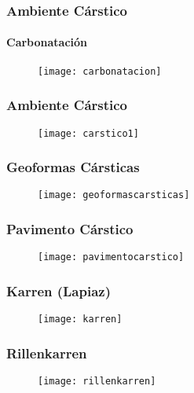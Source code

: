 \documentclass{beamer}
\begin{document}
\begin{frame}
\frametitle{Ambiente Cárstico}
\framesubtitle{Carbonatación}
\begin{figure}
\begin{center}
   	\texttt{[image: carbonatacion]}
\end{center}
\end{figure}
\end{frame}
\begin{frame}
\frametitle{Ambiente Cárstico}
\begin{figure}
\begin{center}
   	\texttt{[image: carstico1]}
\end{center}
\end{figure}
\end{frame}
\begin{frame}
\frametitle{Geoformas Cársticas}
\begin{figure}
\begin{center}
   	\texttt{[image: geoformascarsticas]}
\end{center}
\end{figure}
\end{frame}
\begin{frame}
\frametitle{Pavimento Cárstico}
\begin{figure}
\begin{center}
   	\texttt{[image: pavimentocarstico]}
\end{center}
\end{figure}
\end{frame}
\begin{frame}
\frametitle{Karren (Lapiaz)}
\begin{figure}
\begin{center}
   	\texttt{[image: karren]}
\end{center}
\end{figure}
\end{frame}
\begin{frame}
\frametitle{Rillenkarren}
\begin{figure}
\begin{center}
   	\texttt{[image: rillenkarren]}
\end{center}
\end{figure}
\end{frame}
\end{document}
